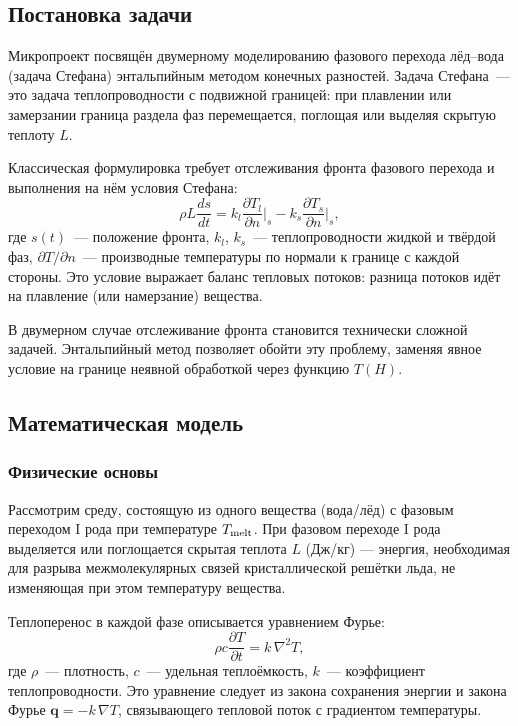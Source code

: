 \subsection{Постановка задачи}

Микропроект посвящён двумерному моделированию фазового перехода лёд--вода
(задача Стефана) энтальпийным методом конечных разностей.
Задача Стефана~--- это задача теплопроводности с подвижной границей:
при плавлении или замерзании граница раздела фаз перемещается,
поглощая или выделяя скрытую теплоту $L$.

Классическая формулировка требует отслеживания фронта фазового перехода
и выполнения на нём условия Стефана:
\begin{equation}\label{eq:stefan_condition}
  \rho L \frac{ds}{dt} = k_l \frac{\partial T_l}{\partial n}\bigg|_{s}
                       - k_s \frac{\partial T_s}{\partial n}\bigg|_{s},
\end{equation}
где $s(t)$~--- положение фронта, $k_l$, $k_s$~--- теплопроводности жидкой
и твёрдой фаз, $\partial T / \partial n$~--- производные температуры по
нормали к границе с каждой стороны. Это условие выражает баланс тепловых
потоков: разница потоков идёт на плавление (или намерзание) вещества.

В двумерном случае отслеживание фронта становится технически сложной задачей.
Энтальпийный метод позволяет обойти эту проблему, заменяя явное условие
на границе неявной обработкой через функцию $T(H)$.

\subsection{Математическая модель}

\subsubsection{Физические основы}

Рассмотрим среду, состоящую из одного вещества (вода/лёд) с фазовым переходом
I рода при температуре $T_{\rm melt}$. При фазовом переходе I рода
выделяется или поглощается скрытая теплота $L$ (Дж/кг) --- энергия,
необходимая для разрыва межмолекулярных связей кристаллической решётки льда,
не изменяющая при этом температуру вещества.

Теплоперенос в каждой фазе описывается уравнением Фурье:
\begin{equation}\label{eq:fourier}
  \rho c \frac{\partial T}{\partial t} = k\,\nabla^2 T,
\end{equation}
где $\rho$~--- плотность, $c$~--- удельная теплоёмкость, $k$~--- коэффициент
теплопроводности. Это уравнение следует из закона сохранения энергии
и закона Фурье $\mathbf{q} = -k\,\nabla T$, связывающего тепловой поток
с градиентом температуры.

